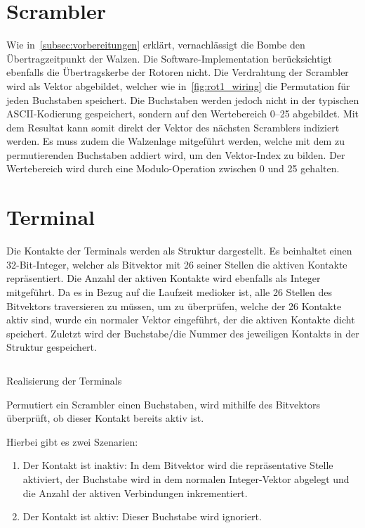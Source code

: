 \section{Scrambler}\label{subsec:impl_scrambler}
Wie in~\cref{subsec:vorbereitungen} erklärt, vernachlässigt die Bombe den Übertragzeitpunkt der Walzen.
Die Software-Implementation berücksichtigt ebenfalls die Übertragskerbe der Rotoren nicht.
Die Verdrahtung der Scrambler wird als Vektor abgebildet, welcher wie in~\cref{fig:rot1_wiring} die Permutation für jeden Buchstaben speichert.
Die Buchstaben werden jedoch nicht in der typischen ASCII-Kodierung gespeichert, sondern auf den Wertebereich 0--25 abgebildet.
Mit dem Resultat kann somit direkt der Vektor des nächsten Scramblers indiziert werden.
Es muss zudem die Walzenlage mitgeführt werden, welche mit dem zu permutierenden Buchstaben addiert wird, um den Vektor-Index zu bilden.
Der Wertebereich wird durch eine Modulo-Operation zwischen 0 und 25 gehalten.

\section{Terminal}\label{subsec:impl_terminal}
Die Kontakte der Terminals werden als Struktur dargestellt.
Es beinhaltet einen 32-Bit-Integer, welcher als Bitvektor mit 26 seiner Stellen die aktiven Kontakte repräsentiert.
Die Anzahl der aktiven Kontakte wird ebenfalls als Integer mitgeführt.
Da es in Bezug auf die Laufzeit medioker ist, alle 26 Stellen des Bitvektors traversieren zu müssen, um zu überprüfen, welche der 26 Kontakte aktiv sind, wurde ein normaler Vektor eingeführt, der die aktiven Kontakte \glqq dicht\grqq{} speichert.
Zuletzt wird der Buchstabe/die Nummer des jeweiligen Kontakts in der Struktur gespeichert.

\begin{mylisting}
	\inputminted{C}{Implementierung/terminal.c}
	\caption{Realisierung der Terminals}
	\label{lst:code_impl_terminal}
\end{mylisting}

Permutiert ein Scrambler einen Buchstaben, wird mithilfe des Bitvektors überprüft, ob dieser Kontakt bereits aktiv ist.

Hierbei gibt es zwei Szenarien:
\begin{enumerate}
	\item Der Kontakt ist inaktiv: In dem Bitvektor wird die repräsentative Stelle aktiviert, der Buchstabe wird in dem normalen Integer-Vektor abgelegt und die Anzahl der aktiven Verbindungen inkrementiert.
	
	\item Der Kontakt ist aktiv: Dieser Buchstabe wird ignoriert. 
\end{enumerate}

